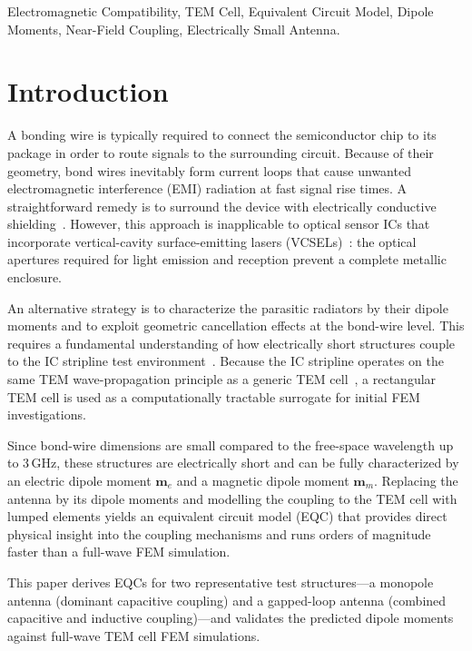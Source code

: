 \documentclass[conference]{IEEEtran}
\begin{document}
\begin{IEEEkeywords}
Electromagnetic Compatibility, TEM Cell, Equivalent Circuit Model,
Dipole Moments, Near-Field Coupling, Electrically Small Antenna.
\end{IEEEkeywords}

\section{Introduction}




A bonding wire is typically required to connect the semiconductor chip
to its package in order to route signals to the surrounding circuit.
Because of their geometry, bond wires inevitably form current loops that
cause unwanted electromagnetic interference (EMI) radiation at fast signal
rise times. A straightforward remedy is to surround the device with
electrically conductive shielding~\cite{b1}. However, this approach is
inapplicable to optical sensor ICs that incorporate vertical-cavity
surface-emitting lasers (VCSELs)~\cite{b2}: the optical apertures required
for light emission and reception prevent a complete metallic enclosure.

An alternative strategy is to characterize the parasitic radiators by their
dipole moments and to exploit geometric cancellation effects at the bond-wire
level. This requires a fundamental understanding of how electrically short
structures couple to the IC stripline test environment~\cite{b5}. Because the
IC stripline operates on the same TEM wave-propagation principle as a generic
TEM cell~\cite{b3}, a rectangular TEM cell is used as a computationally
tractable surrogate for initial FEM investigations.

Since bond-wire dimensions are small compared to the free-space wavelength up
to 3\,GHz, these structures are electrically short and can be fully
characterized by an electric dipole moment $\mathbf{m}_e$ and a magnetic
dipole moment $\mathbf{m}_m$. Replacing the antenna by its dipole moments and
modelling the coupling to the TEM cell with lumped elements yields an
equivalent circuit model (EQC) that provides direct physical insight into the
coupling mechanisms and runs orders of magnitude faster than a full-wave FEM
simulation.

This paper derives EQCs for two representative test structures---a monopole
antenna (dominant capacitive coupling) and a gapped-loop antenna (combined
capacitive and inductive coupling)---and validates the predicted dipole moments
against full-wave TEM cell FEM simulations.
\end{document}
